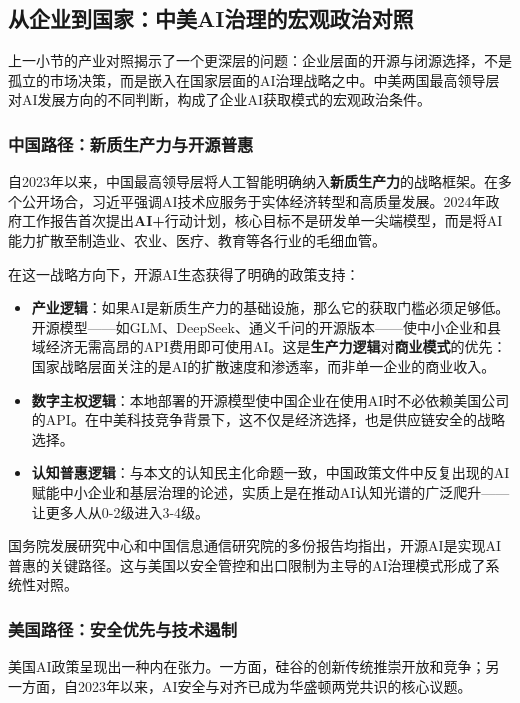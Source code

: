 \documentclass[12pt,a4paper]{ctexart}
\begin{document}
\subsection{从企业到国家：中美AI治理的宏观政治对照}

上一小节的产业对照揭示了一个更深层的问题：企业层面的开源与闭源选择，不是孤立的市场决策，而是嵌入在国家层面的AI治理战略之中。中美两国最高领导层对AI发展方向的不同判断，构成了企业AI获取模式的宏观政治条件。

\subsubsection{中国路径：新质生产力与开源普惠}

自2023年以来，中国最高领导层将人工智能明确纳入\textbf{新质生产力}的战略框架。在多个公开场合，习近平强调AI技术应服务于实体经济转型和高质量发展。2024年政府工作报告首次提出\textbf{AI+}行动计划，核心目标不是研发单一尖端模型，而是将AI能力扩散至制造业、农业、医疗、教育等各行业的毛细血管。

在这一战略方向下，开源AI生态获得了明确的政策支持：

\begin{itemize}
\item \textbf{产业逻辑}：如果AI是新质生产力的基础设施，那么它的获取门槛必须足够低。开源模型——如GLM、DeepSeek、通义千问的开源版本——使中小企业和县域经济无需高昂的API费用即可使用AI。这是\textbf{生产力逻辑}对\textbf{商业模式}的优先：国家战略层面关注的是AI的扩散速度和渗透率，而非单一企业的商业收入。
\item \textbf{数字主权逻辑}：本地部署的开源模型使中国企业在使用AI时不必依赖美国公司的API。在中美科技竞争背景下，这不仅是经济选择，也是供应链安全的战略选择。
\item \textbf{认知普惠逻辑}：与本文的认知民主化命题一致，中国政策文件中反复出现的AI赋能中小企业和基层治理的论述，实质上是在推动AI认知光谱的广泛爬升——让更多人从0-2级进入3-4级。
\end{itemize}

国务院发展研究中心和中国信息通信研究院的多份报告均指出，开源AI是实现AI普惠的关键路径。这与美国以安全管控和出口限制为主导的AI治理模式形成了系统性对照。

\subsubsection{美国路径：安全优先与技术遏制}

美国AI政策呈现出一种内在张力。一方面，硅谷的创新传统推崇开放和竞争；另一方面，自2023年以来，AI安全与对齐已成为华盛顿两党共识的核心议题。
\end{document}
